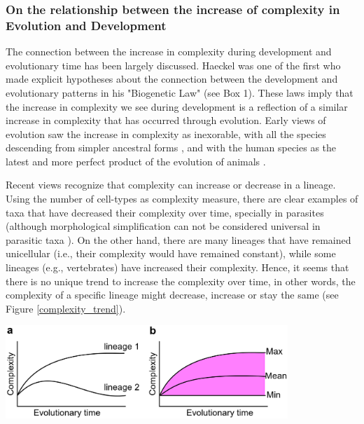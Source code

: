 %
%
\subsubsection{ On the relationship between the increase of complexity in Evolution and Development}
The connection between the increase in complexity during development and evolutionary time has been largely discussed.
Haeckel was one of the first who made explicit hypotheses about the connection between the development and evolutionary patterns in his "Biogenetic Law" (see Box 1).
%
These laws imply that the increase in complexity we see during development is a reflection of a similar increase in complexity that has occurred through evolution.
%
Early views of evolution saw the increase in complexity as inexorable, with all the species descending from simpler ancestral forms \citep{lamarck1809zoo,haeckel1874menschen}, and with the human species as the latest and more perfect product of the evolution of animals \citep{haeckel1874menschen}.


Recent views recognize that complexity can increase or decrease in a lineage.
Using the number of cell-types as complexity measure, there are clear examples of taxa that have decreased their complexity over time, specially in parasites \citep{Canning2003,Arthur2010} (although morphological simplification can not be considered universal in parasitic taxa \citealp{poulin2011evolutionary}). On the other hand, there are many lineages that have remained unicellular (i.e., their complexity would have remained constant), while some lineages (e.g., vertebrates) have increased their complexity. Hence, it seems that there is no unique trend to increase the complexity over time, in other words, the complexity of a specific lineage might decrease, increase or stay the same (see Figure \ref{complexity_trend}).
\par
{\centering
  \includegraphics[width=0.8\textwidth]{./Images/complexity_min.jpeg}
  \centering
\label{complexity_trend}
}
\par

